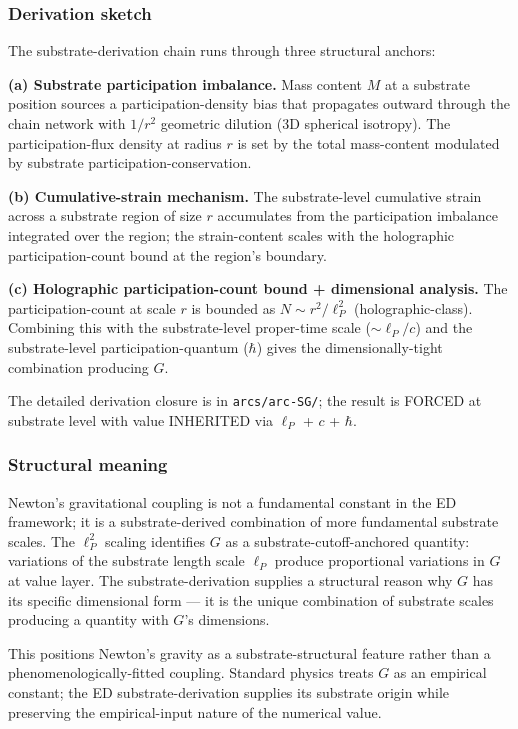 \documentclass[
  11pt,a4paper]{article}
\begin{document}
\subsubsection{Derivation sketch}\label{derivation-sketch}

The substrate-derivation chain runs through three structural anchors:

\textbf{(a) Substrate participation imbalance.} Mass content \(M\) at a
substrate position sources a participation-density bias that propagates
outward through the chain network with \(1/r^2\) geometric dilution (3D
spherical isotropy). The participation-flux density at radius \(r\) is
set by the total mass-content modulated by substrate
participation-conservation.

\textbf{(b) Cumulative-strain mechanism.} The substrate-level cumulative
strain across a substrate region of size \(r\) accumulates from the
participation imbalance integrated over the region; the strain-content
scales with the holographic participation-count bound at the region's
boundary.

\textbf{(c) Holographic participation-count bound + dimensional
analysis.} The participation-count at scale \(r\) is bounded as
\(N \sim r^2/\ell_P^2\) (holographic-class). Combining this with the
substrate-level proper-time scale (\(\sim \ell_P/c\)) and the
substrate-level participation-quantum (\(\hbar\)) gives the
dimensionally-tight combination producing \(G\).

The detailed derivation closure is in \texttt{arcs/arc-SG/}; the result
is FORCED at substrate level with value INHERITED via \(\ell_P\) + \(c\)
+ \(\hbar\).

\subsubsection{Structural meaning}\label{structural-meaning}

Newton's gravitational coupling is not a fundamental constant in the ED
framework; it is a substrate-derived combination of more fundamental
substrate scales. The \(\ell_P^2\) scaling identifies \(G\) as a
substrate-cutoff-anchored quantity: variations of the substrate length
scale \(\ell_P\) produce proportional variations in \(G\) at value
layer. The substrate-derivation supplies a structural reason why \(G\)
has its specific dimensional form --- it is the unique combination of
substrate scales producing a quantity with \(G\)'s dimensions.

This positions Newton's gravity as a substrate-structural feature rather
than a phenomenologically-fitted coupling. Standard physics treats \(G\)
as an empirical constant; the ED substrate-derivation supplies its
substrate origin while preserving the empirical-input nature of the
numerical value.
\end{document}
